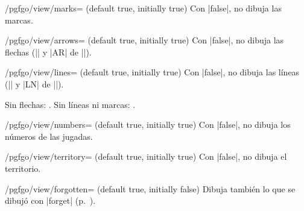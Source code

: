	\begin{key}{/pgfgo/view/marks= (default true, initially true)}
		Con |false|, no dibuja las marcas.
	\end{key}

	\begin{key}{/pgfgo/view/arrows= (default true, initially true)}
		Con |false|, no dibuja las flechas (|\arrow| y |AR| de |\sgf|).
	\end{key}

	\begin{key}{/pgfgo/view/lines= (default true, initially true)}
		Con |false|, no dibuja las líneas (|\line| y |LN| de |\sgf|).

		\begin{codeexample}[]
			\begin{goban}[5, name = tablero-flechas]
			\end{goban}

			Sin flechas: .
			Sin líneas ni marcas: .
		\end{codeexample}
	\end{key}

	\begin{key}{/pgfgo/view/numbers= (default true, initially true)}
		Con |false|, no dibuja los números de las jugadas.
	\end{key}

	\begin{key}{/pgfgo/view/territory= (default true, initially true)}
		Con |false|, no dibuja el territorio.
	\end{key}

	\begin{key}{/pgfgo/view/forgotten= (default true, initially false)}
		Dibuja también lo que se dibujó con |forget| (p.~\pageref{subsec:recordar}).

		\begin{codeexample}[]
			\begin{goban}[5, name = tablero3]
			\end{goban}

		\end{codeexample}
	\end{key}

